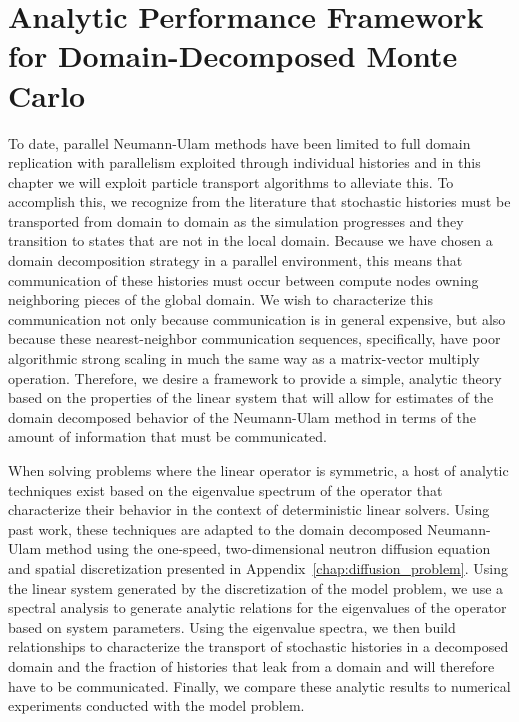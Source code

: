 \clearpage

\section{Analytic Performance Framework for Domain-Decomposed Monte Carlo}
\label{sec:analytic_framework}
To date, parallel Neumann-Ulam methods have been limited to full
domain replication with parallelism exploited through individual
histories \citep{alexandrov_efficient_1998} and in this chapter we
will exploit particle transport algorithms to alleviate this. To
accomplish this, we recognize from the literature that stochastic
histories must be transported from domain to domain as the simulation
progresses and they transition to states that are not in the local
domain. Because we have chosen a domain decomposition strategy in a
parallel environment, this means that communication of these histories
must occur between compute nodes owning neighboring pieces of the
global domain. We wish to characterize this communication not only
because communication is in general expensive, but also because these
nearest-neighbor communication sequences, specifically, have poor
algorithmic strong scaling \citep{gropp_high-performance_2001} in much
the same way as a matrix-vector multiply operation. Therefore, we
desire a framework to provide a simple, analytic theory based on the
properties of the linear system that will allow for estimates of the
domain decomposed behavior of the Neumann-Ulam method in terms of the
amount of information that must be communicated.

When solving problems where the linear operator is symmetric, a host
of analytic techniques exist based on the eigenvalue spectrum of the
operator that characterize their behavior in the context of
deterministic linear solvers. Using past work, these techniques are
adapted to the domain decomposed Neumann-Ulam method using the
one-speed, two-dimensional neutron diffusion equation and spatial
discretization presented in
Appendix~\ref{chap:diffusion_problem}. Using the linear system
generated by the discretization of the model problem, we use a
spectral analysis to generate analytic relations for the eigenvalues
of the operator based on system parameters. Using the eigenvalue
spectra, we then build relationships to characterize the transport of
stochastic histories in a decomposed domain and the fraction of
histories that leak from a domain and will therefore have to be
communicated. Finally, we compare these analytic results to numerical
experiments conducted with the model problem.


